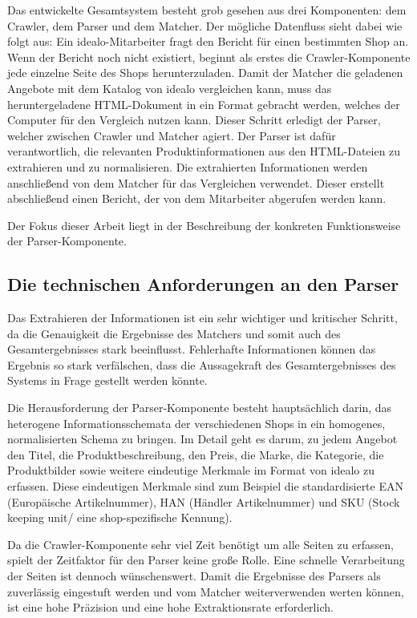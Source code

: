 Das entwickelte Gesamtsystem besteht grob gesehen aus drei Komponenten: dem Crawler, dem Parser und dem Matcher.
Der mögliche Datenfluss sieht dabei wie folgt aus:
Ein idealo-Mitarbeiter fragt den Bericht für einen bestimmten Shop an.
Wenn der Bericht noch nicht existiert, beginnt als erstes die Crawler-Komponente jede einzelne Seite des Shops
herunterzuladen.
Damit der Matcher die geladenen Angebote mit dem Katalog von idealo vergleichen kann, muss das heruntergeladene
HTML-Dokument in ein Format gebracht werden, welches der Computer für den Vergleich nutzen kann.
Dieser Schritt erledigt der Parser, welcher zwischen Crawler und Matcher agiert.
Der Parser ist dafür verantwortlich, die relevanten Produktinformationen aus den HTML-Dateien zu extrahieren und zu
normalisieren.
Die extrahierten Informationen werden anschließend von dem Matcher für das Vergleichen verwendet.
Dieser erstellt abschließend einen Bericht, der von dem Mitarbeiter abgerufen werden kann.

Der Fokus dieser Arbeit liegt in der Beschreibung der konkreten Funktionsweise der Parser-Komponente.

\subsection{Die technischen Anforderungen an den Parser}
\label{subsec:technische-anforderungen-parser}

Das Extrahieren der Informationen ist ein sehr wichtiger und kritischer Schritt, da die Genauigkeit die Ergebnisse
des Matchers und somit auch des Gesamtergebnisses stark beeinflusst.
Fehlerhafte Informationen können das Ergebnis so stark verfälschen, dass die Aussagekraft des Gesamtergebnisses des
Systems in Frage gestellt werden könnte.

Die Herausforderung der Parser-Komponente besteht hauptsächlich darin, das heterogene Informationsschemata der
verschiedenen Shops in ein homogenes, normalisierten Schema zu bringen.
Im Detail geht es darum, zu jedem Angebot den Titel, die Produktbeschreibung, den Preis, die Marke, die Kategorie,
die Produktbilder sowie weitere eindeutige Merkmale im Format von idealo zu erfassen.
Diese eindeutigen Merkmale sind zum Beispiel die standardisierte EAN (Europäische Artikelnummer), HAN (Händler
Artikelnummer) und SKU (Stock keeping unit/ eine shop-spezifische Kennung).

Da die Crawler-Komponente sehr viel Zeit benötigt um alle Seiten zu erfassen, spielt der Zeitfaktor für den Parser
keine große Rolle.
Eine schnelle Verarbeitung der Seiten ist dennoch wünschenswert.
Damit die Ergebnisse des Parsers als zuverlässig eingestuft werden und vom Matcher weiterverwenden werten können, ist
eine hohe Präzision und eine hohe Extraktionsrate erforderlich.
